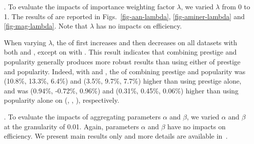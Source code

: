 .
To evaluate the impacts of importance weighting factor $\lambda$, we varied $\lambda$ from 0 to 1.
The results of \PairAcc are reported in Figs.~\ref{fig-aan-lambda}, \ref{fig-aminer-lambda} and \ref{fig-mag-lambda}. Note that $\lambda$ has no impacts on efficiency.

When varying $\lambda$, the \PairAcc of \ensemblerank first increases and then decreases on all datasets with both \fcita and \recom, except on \aminer with \recom. This result indicates that combining prestige and popularity generally produces more robust results than using either of prestige and popularity.
Indeed, with \recom and \fcita, the \PairAcc of combining prestige and popularity was (10.8\%, 13.3\%, 6.4\%) and (3.5\%, 9.7\%, 7.7\%) higher than using prestige alone, and was (0.94\%, -0.72\%, 0.96\%) and (0.31\%, 0.45\%, 0.06\%) higher than using popularity alone on (\aan, \aminer, \magdata), respectively.




.
To evaluate the impacts of aggregating parameters $\alpha$ and $\beta$, we varied $\alpha$ and $\beta$ at the granularity of 0.01.
Again, parameters $\alpha$ and $\beta$ have no impacts on efficiency. We present main results only and more details are available in~\cite{SARank-full}.



